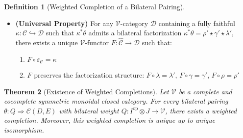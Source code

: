 \documentclass[11pt]{article}
\theoremstyle{plain}
\newtheorem{theorem}{Theorem}[section]
\theoremstyle{definition}
\newtheorem{definition}[theorem]{Definition}
\theoremstyle{remark}
\newcommand{\V}{\mathcal{V}}
\newcommand{\C}{\mathcal{C}}
\newcommand{\op}{\mathrm{op}}
\begin{document}
\begin{definition}[Weighted Completion of a Bilateral Pairing]
\begin{itemize}
\item \textbf{(Universal Property)} For any $\V$-category $\mathcal{D}$ containing a fully faithful $\kappa : \mathcal{C} \hookrightarrow \mathcal{D}$ such that $\kappa^* \theta$ admits a bilateral factorization $\kappa^* \theta = \rho' \star \gamma' \star \lambda'$, there exists a unique $\V$-functor $F : \widehat{\mathcal{C}} \to \mathcal{D}$ such that:
\begin{enumerate}
\item $F \circ \varepsilon_{\mathcal{C}} = \kappa$
\item $F$ preserves the factorization structure: $F \circ \lambda = \lambda'$, $F \circ \gamma = \gamma'$, $F \circ \rho = \rho'$
\end{enumerate}
\end{itemize}
\end{definition}

\begin{center}
\end{center}

\begin{theorem}[Existence of Weighted Completions]\label{thm:universal-existence}
Let $\V$ be a complete and cocomplete symmetric monoidal closed category. For every bilateral pairing $\theta : Q \Rightarrow \C(D,E)$ with bilateral weight $Q : I^{\op} \otimes J \to \V$, there exists a weighted completion. Moreover, this weighted completion is unique up to unique isomorphism.
\end{theorem}
\end{document}
